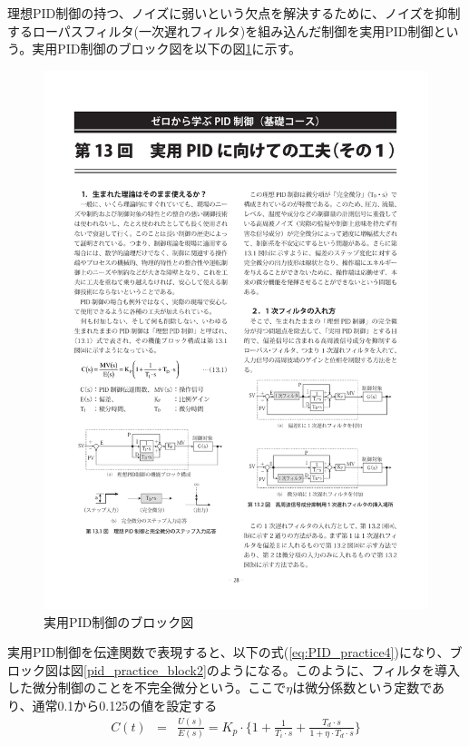 \documentclass[a4j]{ujarticle}
\begin{document}
\clearpage
理想PID制御の持つ、ノイズに弱いという欠点を解決するために、ノイズを抑制するローパスフィルタ(一次遅れフィルタ)を組み込んだ制御を実用PID制御という。実用PID制御のブロック図を以下の図\ref{pid_practice_block}に示す。
\begin{figure}[htbp]
  \centering
  \includegraphics[width=0.8\hsize]{pid_practice_block.pdf}
  \caption{実用PID制御のブロック図}
  \label{pid_practice_block}
\end{figure}
実用PID制御を伝達関数で表現すると、以下の式(\ref{eq:PID_practice4})になり、ブロック図は図\ref{pid_practice_block2}のようになる。このように、フィルタを導入した微分制御のことを不完全微分という。ここで$\eta$は微分係数という定数であり、通常0.1から0.125の値を設定する\cite{実用PIDに向けての工夫その１}
\begin{eqnarray}
  C(t) &=& \frac{U(s)}{E(s)} = K_p \cdot \{1 + \frac{1}{T_i \cdot s}  +  \frac{T_d \cdot s}{1 + \eta \cdot T_d \cdot s}\}
  \label{eq:PID_practice4}
\end{eqnarray}
\end{document}
